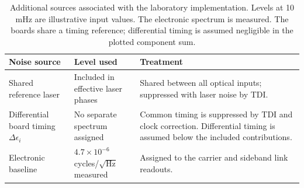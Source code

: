 \begin{table}[t]
\centering
\caption{Additional sources associated with the laboratory implementation. Levels at 10 mHz are illustrative input values. The electronic spectrum is measured. The boards share a timing reference; differential timing is assumed negligible in the plotted component sum.}
\label{tab:lab_noise}
\small
\renewcommand{\arraystretch}{1.2}
\begin{tabular}{lll}
\hline
\parbox[t]{0.24\textwidth}{\raggedright Noise source\par\vspace{3pt}} & \parbox[t]{0.28\textwidth}{\raggedright Level used\par\vspace{3pt}} & \parbox[t]{0.41\textwidth}{\raggedright Treatment\par\vspace{3pt}} \\[5pt]
\hline
\parbox[t]{0.24\textwidth}{\raggedright Shared reference laser\par\vspace{3pt}} & \parbox[t]{0.28\textwidth}{\raggedright Included in effective laser phases\par\vspace{3pt}} & \parbox[t]{0.41\textwidth}{\raggedright Shared between all optical inputs; suppressed with laser noise by TDI.\par\vspace{3pt}} \\[5pt]
\parbox[t]{0.24\textwidth}{\raggedright Differential board timing $\Delta\epsilon_i$\par\vspace{3pt}} & \parbox[t]{0.28\textwidth}{\raggedright No separate spectrum assigned\par\vspace{3pt}} & \parbox[t]{0.41\textwidth}{\raggedright Common timing is suppressed by TDI and clock correction. Differential timing is assumed below the included contributions.\par\vspace{3pt}} \\[5pt]
\parbox[t]{0.24\textwidth}{\raggedright Electronic baseline\par\vspace{3pt}} & \parbox[t]{0.28\textwidth}{\raggedright $4.7\times10^{-6}$ cycles/$\sqrt{\mathrm{Hz}}$ measured\par\vspace{3pt}} & \parbox[t]{0.41\textwidth}{\raggedright Assigned to the carrier and sideband link readouts.\par\vspace{3pt}} \\[5pt]

\end{tabular}
\end{table}
